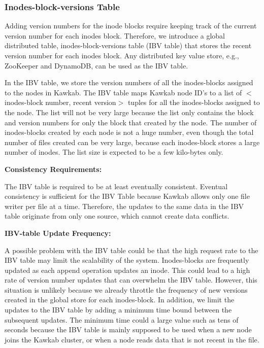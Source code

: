 \documentclass[]{article}
\newcommand{\subtopic}[1]{\vspace{1.5pt} \noindent \textbf{#1}}
\begin{document}
\subsubsection{Inodes-block-versions Table}

Adding version numbers for the inode blocks require keeping track of the
current version number for each inodes block. Therefore, we introduce a global
distributed table, inodes-block-versions table (IBV table) that stores the
recent version number for each inodes block. Any distributed key value store,
e.g., ZooKeeper and DynamoDB, can be used as the IBV table. 

In the IBV table, we store the version numbers of all the inodes-blocks
assigned to the nodes in Kawkab. The IBV table maps Kawkab node ID's
to a list of $<$inodes-block number, recent version$>$ tuples for all
the inodes-blocks assigned to the node. The list will not be very
large because the list only contains the block and version numbers for
only the block that created by the node. The number of inodes-blocks
created by each node is not a huge number, even though the total number
of files created can be very large,  because each inodes-block stores
a large number of inodes. The list size is expected to be a few kilo-bytes
only.

\subtopic{Consistency Requirements:}

The IBV table is required to be at least eventually consistent.
Eventual consistency is sufficient for the IBV Table because Kawkab
allows only one file writer per file at a time.
Therefore, the updates to the same data in the IBV table originate from only
one source, which cannot create data conflicts.

\subtopic{IBV-table Update Frequency:}

A possible problem with the IBV table could be that the high request rate to
the IBV table may limit the scalability of the system. Inodes-blocks are
frequently updated as each append operation updates an inode. This could lead
to a high rate of version number updates that can overwhelm the IBV table.
However, this situation is unlikely because we already throttle the frequency
of new versions created in the global store for each inodes-block.  In
addition, we limit the updates to the IBV table by adding a minimum time bound
between the subsequent updates. The minimum time
could a large value such as tens of seconds because the IBV table is mainly
supposed to be used when a new node joins the Kawkab cluster, or when a node
reads data that is not recent in the file.
\end{document}
